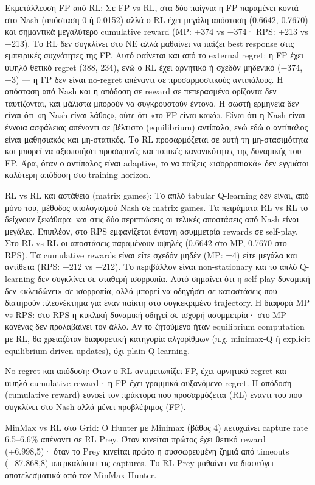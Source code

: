 \documentclass[11pt,a4paper]{article}
\begin{document}
Εκμετάλλευση FP από RL: Σε FP vs RL, στα δύο παίγνια η FP παραμένει κοντά στο Nash (απόσταση 0 ή 0.0152) αλλά ο RL έχει μεγάλη απόσταση (0.6642, 0.7670) και σημαντικά μεγαλύτερο cumulative reward (MP: +374 vs −374· RPS: +213 vs −213). Το RL δεν συγκλίνει στο NE αλλά μαθαίνει να παίζει best response στις εμπειρικές συχνότητες της FP. Αυτό φαίνεται και από το external regret: η FP έχει υψηλό θετικό regret (388, 234), ενώ ο RL έχει αρνητικό ή σχεδόν μηδενικό (−374, −3) — η FP δεν είναι no-regret απέναντι σε προσαρμοστικούς αντιπάλους. Η απόσταση από Nash και η απόδοση σε reward σε πεπερασμένο ορίζοντα δεν ταυτίζονται, και μάλιστα μπορούν να συγκρουστούν έντονα. Η σωστή ερμηνεία δεν είναι ότι «η Nash είναι λάθος», ούτε ότι «το FP είναι κακό». Είναι ότι η Nash είναι έννοια ασφάλειας απέναντι σε βέλτιστο (equilibrium) αντίπαλο, ενώ εδώ ο αντίπαλος είναι μαθησιακός και μη-στατικός. Το RL προσαρμόζεται σε αυτή τη μη-στασιμότητα και μπορεί να αξιοποιήσει προσωρινές και τοπικές κανονικότητες της δυναμικής του FP. Άρα, όταν ο αντίπαλος είναι adaptive, το να παίζεις «ισορροπιακά» δεν εγγυάται καλύτερη απόδοση στο training horizon.

RL vs RL και αστάθεια (matrix games): Το απλό tabular Q-learning δεν είναι, από μόνο του, μέθοδος υπολογισμού Nash σε matrix games. Τα πειράματα RL vs RL το δείχνουν ξεκάθαρα: και στις δύο περιπτώσεις οι τελικές αποστάσεις από Nash είναι μεγάλες. Επιπλέον, στο RPS εμφανίζεται έντονη ασυμμετρία rewards σε self-play. Στο RL vs RL οι αποστάσεις παραμένουν υψηλές (0.6642 στο MP, 0.7670 στο RPS). Τα cumulative rewards είναι είτε σχεδόν μηδέν (MP: ±4) είτε μεγάλα και αντίθετα (RPS: +212 vs −212). Το περιβάλλον είναι non-stationary και το απλό Q-learning δεν συγκλίνει σε σταθερή ισορροπία. Αυτό σημαίνει ότι η self-play δυναμική δεν «κλειδώνει» σε ισορροπία, αλλά μπορεί να οδηγήσει σε καταστάσεις που διατηρούν πλεονέκτημα για έναν παίκτη στο συγκεκριμένο trajectory. Η διαφορά MP vs RPS: στο RPS η κυκλική δυναμική οδηγεί σε ισχυρή ασυμμετρία· στο MP κανένας δεν προλαβαίνει τον άλλο. Αν το ζητούμενο ήταν equilibrium computation με RL, θα χρειαζόταν διαφορετική κατηγορία αλγορίθμων (π.χ. minimax-Q ή explicit equilibrium-driven updates), όχι plain Q-learning.

No-regret και απόδοση: Όταν ο RL αντιμετωπίζει FP, έχει αρνητικό regret και υψηλό cumulative reward· η FP έχει γραμμικά αυξανόμενο regret. Η απόδοση (cumulative reward) ευνοεί τον πράκτορα που προσαρμόζεται (RL) έναντι του που συγκλίνει στο Nash αλλά μένει προβλέψιμος (FP).

MinMax vs RL στο Grid: Ο Hunter με Minimax (βάθος 4) πετυχαίνει capture rate 6.5–6.6\% απέναντι σε RL Prey. Όταν κινείται πρώτος έχει θετικό reward (+6.998,5)· όταν το Prey κινείται πρώτο η συσσωρευμένη ζημιά από timeouts (−87.868,8) υπερκαλύπτει τις captures. Το RL Prey μαθαίνει να διαφεύγει αποτελεσματικά από τον MinMax Hunter.
\end{document}
